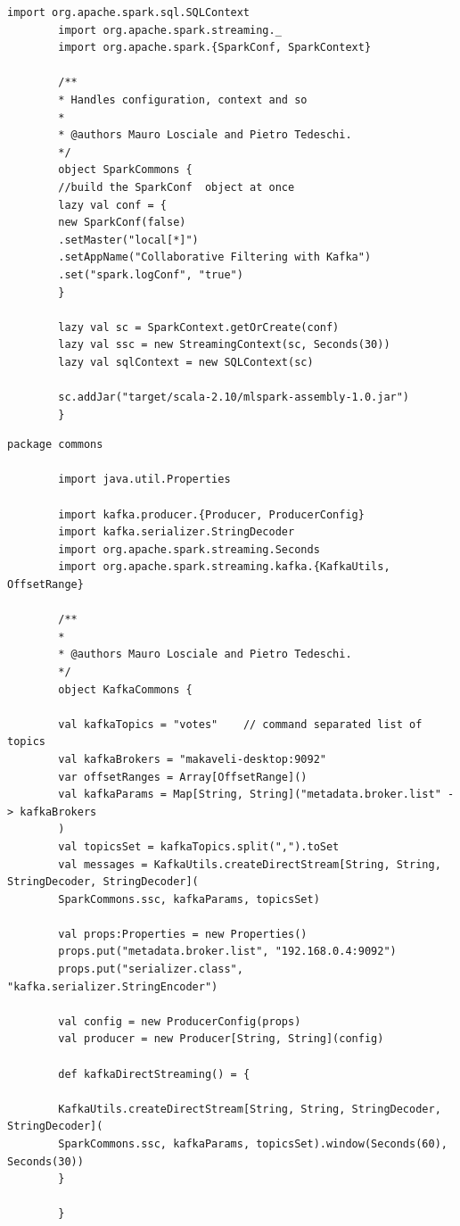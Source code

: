 \documentclass[11pt]{article}
\begin{document}
\begin{appendices}
\begin{lstlisting}[style=scalacode, caption=SparkCommons.scala]
		import org.apache.spark.sql.SQLContext
		import org.apache.spark.streaming._
		import org.apache.spark.{SparkConf, SparkContext}
		
		/**
		* Handles configuration, context and so
		*
		* @authors Mauro Losciale and Pietro Tedeschi.
		*/
		object SparkCommons {
		//build the SparkConf  object at once
		lazy val conf = {
		new SparkConf(false)
		.setMaster("local[*]")
		.setAppName("Collaborative Filtering with Kafka")
		.set("spark.logConf", "true")
		}
		
		lazy val sc = SparkContext.getOrCreate(conf)
		lazy val ssc = new StreamingContext(sc, Seconds(30))
		lazy val sqlContext = new SQLContext(sc)
		
		sc.addJar("target/scala-2.10/mlspark-assembly-1.0.jar")
		}
	\end{lstlisting}
	
	\begin{lstlisting}[style=scalacode, caption=KafkaCommons.scala]
		package commons
		
		import java.util.Properties
		
		import kafka.producer.{Producer, ProducerConfig}
		import kafka.serializer.StringDecoder
		import org.apache.spark.streaming.Seconds
		import org.apache.spark.streaming.kafka.{KafkaUtils, OffsetRange}
		
		/**
		*
		* @authors Mauro Losciale and Pietro Tedeschi.
		*/
		object KafkaCommons {
		
		val kafkaTopics = "votes"    // command separated list of topics
		val kafkaBrokers = "makaveli-desktop:9092"
		var offsetRanges = Array[OffsetRange]()
		val kafkaParams = Map[String, String]("metadata.broker.list" -> kafkaBrokers
		)
		val topicsSet = kafkaTopics.split(",").toSet
		val messages = KafkaUtils.createDirectStream[String, String, StringDecoder, StringDecoder](
		SparkCommons.ssc, kafkaParams, topicsSet)
		
		val props:Properties = new Properties()
		props.put("metadata.broker.list", "192.168.0.4:9092")
		props.put("serializer.class", "kafka.serializer.StringEncoder")
		
		val config = new ProducerConfig(props)
		val producer = new Producer[String, String](config)
		
		def kafkaDirectStreaming() = {
		
		KafkaUtils.createDirectStream[String, String, StringDecoder, StringDecoder](
		SparkCommons.ssc, kafkaParams, topicsSet).window(Seconds(60), Seconds(30))
		}
		
		}
		

\end{lstlisting}
\end{appendices}
\end{document}
